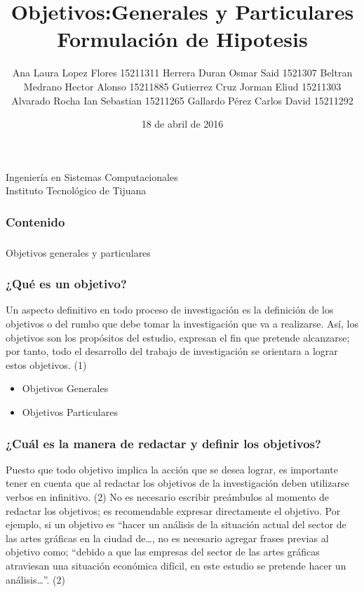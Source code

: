 \documentclass{beamer}
\title{Objetivos:Generales y Particulares   \linebreak Formulación de Hipotesis}
\author{Ana Laura Lopez Flores 15211311 \linebreak Herrera Duran Osmar Said 1521307 \linebreak Beltran Medrano Hector Alonso 15211885 \linebreak Gutierrez Cruz Jorman Eliud 15211303 \linebreak Alvarado Rocha Ian Sebastian 15211265 \linebreak Gallardo Pérez Carlos David 15211292
	}
\date{18 de abril de 2016}
\begin{document}
	\begin{frame}
		\titlepage
		\scriptsize
		\begin{center}
			Ingeniería en Sistemas Computacionales \\
			Instituto Tecnológico de Tijuana \\
		\end{center}
	\end{frame}
	
	\begin{frame}
		\frametitle{Contenido}
		\tableofcontents
	\end{frame}
	
	\begin{frame}
		\frametitle{}
		\begin{center}
		{\LARGE Objetivos generales y particulares	}
		\end{center}						
	\end{frame}
	
	\begin{frame}
		\frametitle{¿Qué es un objetivo?}
		\begin{definition}
			Un aspecto definitivo en todo proceso de investigación es la definición de los objetivos o del rumbo que debe tomar la investigación que va a realizarse. Así, los objetivos son los propósitos del estudio, expresan el fin que pretende alcanzarse; por tanto, todo el desarrollo del trabajo de investigación se orientara a lograr estos objetivos. (1)
			\linebreak 
		\end{definition}
		\begin{example}
			\begin{itemize}
				\item Objetivos Generales
				\item Objetivos Particulares 
			\end{itemize}
		\end{example}
	\end{frame}
		\begin{frame}
			\frametitle{¿Cuál es la manera de redactar y definir los objetivos?}
			\begin{definition}
			Puesto que todo objetivo implica la acción que se desea lograr, es importante tener en cuenta que al redactar los objetivos de la investigación deben utilizarse verbos en infinitivo. (2)	
			No es necesario escribir preámbulos al momento de redactar los objetivos; es recomendable expresar directamente el objetivo. Por ejemplo, si un objetivo es “hacer un análisis de la situación actual del sector de las artes gráficas en la ciudad de…, no es necesario agregar frases previas al objetivo como; “debido a que las empresas del sector de las artes gráficas atraviesan una situación económica difícil, en este estudio se pretende hacer un análisis…”. (2)
			\end{definition}
		\end{frame}
\end{document}

